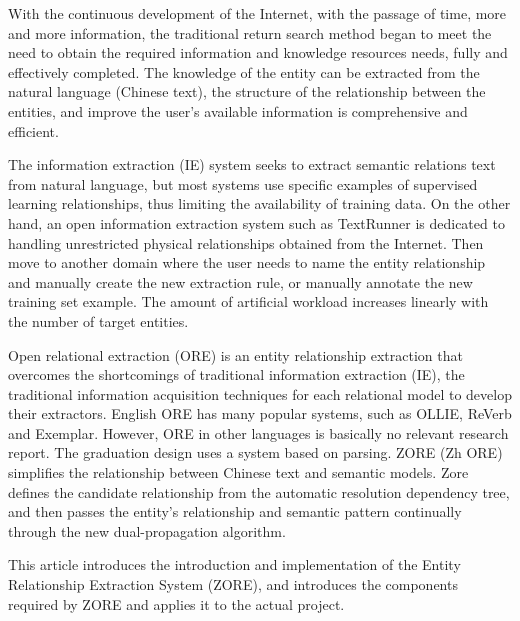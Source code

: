\begin{enabstract}
With the continuous development of the Internet, with the passage of time, more and more information, the traditional return search method began to meet the need to obtain the required information and knowledge resources needs, fully and effectively completed. The knowledge of the entity can be extracted from the natural language (Chinese text), the structure of the relationship between the entities, and improve the user's available information is comprehensive and efficient.

The information extraction (IE) system seeks to extract semantic relations text from natural language, but most systems use specific examples of supervised learning relationships, thus limiting the availability of training data. On the other hand, an open information extraction system such as TextRunner is dedicated to handling unrestricted physical relationships obtained from the Internet. Then move to another domain where the user needs to name the entity relationship and manually create the new extraction rule, or manually annotate the new training set example. The amount of artificial workload increases linearly with the number of target entities.

Open relational extraction (ORE) is an entity relationship extraction that overcomes the shortcomings of traditional information extraction (IE), the traditional information acquisition techniques for each relational model to develop their extractors. English ORE has many popular systems, such as OLLIE, ReVerb and Exemplar. However, ORE in other languages ​​is basically no relevant research report. The graduation design uses a system based on parsing. ZORE (Zh ORE) simplifies the relationship between Chinese text and semantic models. Zore defines the candidate relationship from the automatic resolution dependency tree, and then passes the entity's relationship and semantic pattern continually through the new dual-propagation algorithm.

This article introduces the introduction and implementation of the Entity Relationship Extraction System (ZORE), and introduces the components required by ZORE and applies it to the actual project.

\end{enabstract}

